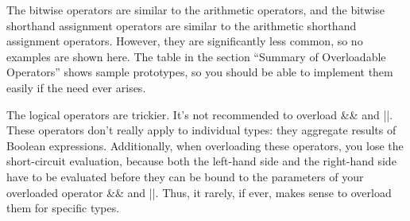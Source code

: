 The bitwise operators are similar to the arithmetic operators, and the bitwise shorthand assignment operators are similar to the arithmetic shorthand assignment operators. However, they are significantly less common, so no examples are shown here. The table in the section “Summary of Overloadable Operators” shows sample prototypes, so you should be able to implement them easily if the need ever arises.

The logical operators are trickier. It’s not recommended to overload \&\& and ||. These operators don’t really apply to individual types: they aggregate results of Boolean expressions. Additionally, when overloading these operators, you lose the short-circuit evaluation, because both the left-hand side and the right-hand side have to be evaluated before they can be bound to the parameters of your overloaded operator \&\& and ||. Thus, it rarely, if ever, makes sense to overload them for specific types.